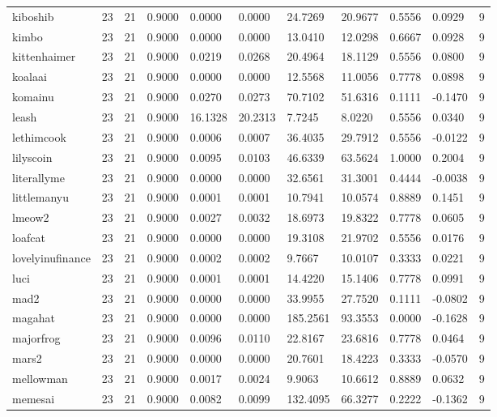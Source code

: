 \begin{table}[htbp]
\begin{tabular}{lllllllllll}
kiboshib & 23 & 21 & 0.9000 & 0.0000 & 0.0000 & 24.7269 & 20.9677 & 0.5556 & 0.0929 & 9 \\
kimbo & 23 & 21 & 0.9000 & 0.0000 & 0.0000 & 13.0410 & 12.0298 & 0.6667 & 0.0928 & 9 \\
kittenhaimer & 23 & 21 & 0.9000 & 0.0219 & 0.0268 & 20.4964 & 18.1129 & 0.5556 & 0.0800 & 9 \\
koalaai & 23 & 21 & 0.9000 & 0.0000 & 0.0000 & 12.5568 & 11.0056 & 0.7778 & 0.0898 & 9 \\
komainu & 23 & 21 & 0.9000 & 0.0270 & 0.0273 & 70.7102 & 51.6316 & 0.1111 & -0.1470 & 9 \\
leash & 23 & 21 & 0.9000 & 16.1328 & 20.2313 & 7.7245 & 8.0220 & 0.5556 & 0.0340 & 9 \\
lethimcook & 23 & 21 & 0.9000 & 0.0006 & 0.0007 & 36.4035 & 29.7912 & 0.5556 & -0.0122 & 9 \\
lilyscoin & 23 & 21 & 0.9000 & 0.0095 & 0.0103 & 46.6339 & 63.5624 & 1.0000 & 0.2004 & 9 \\
literallyme & 23 & 21 & 0.9000 & 0.0000 & 0.0000 & 32.6561 & 31.3001 & 0.4444 & -0.0038 & 9 \\
littlemanyu & 23 & 21 & 0.9000 & 0.0001 & 0.0001 & 10.7941 & 10.0574 & 0.8889 & 0.1451 & 9 \\
lmeow2 & 23 & 21 & 0.9000 & 0.0027 & 0.0032 & 18.6973 & 19.8322 & 0.7778 & 0.0605 & 9 \\
loafcat & 23 & 21 & 0.9000 & 0.0000 & 0.0000 & 19.3108 & 21.9702 & 0.5556 & 0.0176 & 9 \\
lovelyinufinance & 23 & 21 & 0.9000 & 0.0002 & 0.0002 & 9.7667 & 10.0107 & 0.3333 & 0.0221 & 9 \\
luci & 23 & 21 & 0.9000 & 0.0001 & 0.0001 & 14.4220 & 15.1406 & 0.7778 & 0.0991 & 9 \\
mad2 & 23 & 21 & 0.9000 & 0.0000 & 0.0000 & 33.9955 & 27.7520 & 0.1111 & -0.0802 & 9 \\
magahat & 23 & 21 & 0.9000 & 0.0000 & 0.0000 & 185.2561 & 93.3553 & 0.0000 & -0.1628 & 9 \\
majorfrog & 23 & 21 & 0.9000 & 0.0096 & 0.0110 & 22.8167 & 23.6816 & 0.7778 & 0.0464 & 9 \\
mars2 & 23 & 21 & 0.9000 & 0.0000 & 0.0000 & 20.7601 & 18.4223 & 0.3333 & -0.0570 & 9 \\
mellowman & 23 & 21 & 0.9000 & 0.0017 & 0.0024 & 9.9063 & 10.6612 & 0.8889 & 0.0632 & 9 \\
memesai & 23 & 21 & 0.9000 & 0.0082 & 0.0099 & 132.4095 & 66.3277 & 0.2222 & -0.1362 & 9 \\

\end{tabular}
\end{table}
